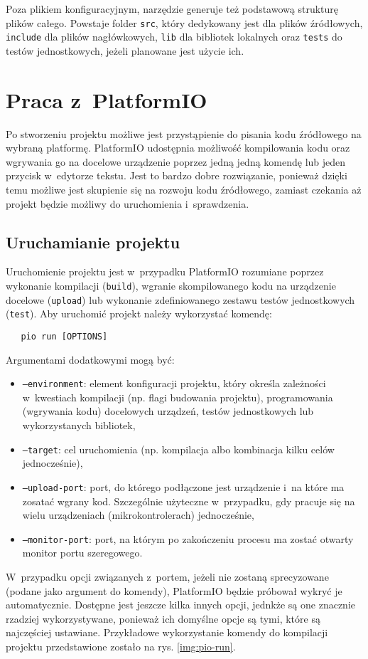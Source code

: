 Poza plikiem konfiguracyjnym, narzędzie generuje też podstawową strukturę plików całego. Powstaje folder \texttt{src},
który dedykowany jest dla plików źródłowych, \texttt{include} dla plików nagłówkowych, \texttt{lib} dla bibliotek
lokalnych oraz \texttt{tests} do testów jednostkowych, jeżeli planowane jest użycie ich.

\section{Praca z~PlatformIO\label{sect:pio-work}} Po stworzeniu projektu możliwe jest przystąpienie do pisania kodu
źródłowego na wybraną platformę. PlatformIO udostępnia możliwość kompilowania kodu oraz wgrywania go na docelowe
urządzenie poprzez jedną jedną komendę lub jeden przycisk w~edytorze tekstu. Jest to bardzo dobre rozwiązanie,
ponieważ dzięki temu możliwe jest skupienie się na rozwoju kodu źródłowego, zamiast czekania aż projekt będzie możliwy
do uruchomienia i~sprawdzenia.

\subsection{Uruchamianie projektu\label{sect:pio-run}} Uruchomienie projektu jest w~przypadku PlatformIO rozumiane
poprzez wykonanie kompilacji (\texttt{build}), wgranie skompilowanego kodu na urządzenie docelowe (\texttt{upload}) lub
wykonanie zdefiniowanego zestawu testów jednostkowych (\texttt{test}). Aby uruchomić projekt należy wykorzystać komendę:
\begin{verbatim}
   pio run [OPTIONS]
\end{verbatim}
Argumentami dodatkowymi mogą być:
\begin{itemize}[label=]
    \item \texttt{--environment}: element konfiguracji projektu, który określa zależności w~kwestiach
          kompilacji (np. flagi budowania projektu), programowania (wgrywania kodu) docelowych urządzeń, testów
          jednostkowych lub wykorzystanych bibliotek,
    \item \texttt{--target}: cel uruchomienia (np. kompilacja albo kombinacja kilku celów jednocześnie),
    \item \texttt{--upload-port}: port, do którego podłączone jest urządzenie i~na które ma zosatać wgrany kod.
          Szczególnie użyteczne w~przypadku, gdy pracuje się na wielu urządzeniach (mikrokontrolerach) jednocześnie,
    \item \texttt{--monitor-port}: port, na którym po zakończeniu procesu ma zostać otwarty monitor portu szeregowego.
\end{itemize}
W~przypadku opcji związanych z~portem, jeżeli nie zostaną sprecyzowane (podane jako argument do komendy), PlatformIO
będzie próbował wykryć je automatycznie. Dostępne jest jeszcze kilka innych opcji, jednkże są one znacznie rzadziej
wykorzystywane, ponieważ ich domyślne opcje są tymi, które są najczęściej ustawiane. Przykładowe wykorzystanie komendy
do kompilacji projektu przedstawione zostało na rys. \ref{img:pio-run}.

